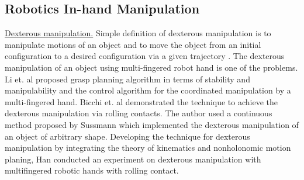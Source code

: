




\subsection{Robotics In-hand Manipulation}
\noindent\uline{Dexterous manipulation.} Simple definition of dexterous manipulation is to manipulate motions of an object and to move the object from an initial configuration to a desired configuration via a given trajectory \cite{Okamura_2000_Overview_DM, Bullock11_Classify_HandManipulation, Ma_2011_dexterity_DM}. The dexterous manipulation of an object using multi-fingered robot hand is one of the problems. Li et. al \cite{Z.Li89_MotionPlanning_Dex.Manipulation} proposed grasp planning algorithm in terms of stability and manipulability and the control algorithm for the coordinated manipulation by a multi-fingered hand. Bicchi et. al \cite{Bicchi95_Dex.Manipulation_Rolling, Bicchi_2000_RC_Dexterous} demonstrated the technique to achieve the dexterous manipulation via rolling contacts. 
The author used a continuous method proposed by Sussmann \cite{Sussman93_Continuous_Nonholonomic_Path} which implemented the dexterous manipulation of an object of arbitrary shape. 
Developing the technique for dexterous manipulation by integrating the theory of kinematics and nonholonomic motion planing, Han \cite{Han97_Dex.Manipulation_RC} conducted an experiment on dexterous manipulation with multifingered robotic hands with rolling contact.\\

